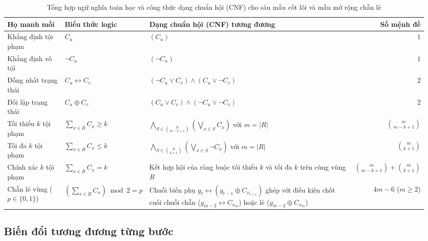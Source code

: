 \begin{table}[H]
\centering
\caption{%
    Tổng hợp ngữ nghĩa toán học và công thức dạng chuẩn hội (CNF) cho sáu mẫu cốt
    lõi và mẫu mở rộng chẵn lẻ}
\label{tab:cnf_catalog}
\footnotesize
\begin{tabularx}{\textwidth}{l l >{\raggedright\arraybackslash}X r}
\toprule
\textbf{Họ manh mối} & \textbf{Biểu thức logic} & \textbf{Dạng chuẩn hội (CNF)
tương đương} & \textbf{Số mệnh đề} \\
\midrule
Khẳng định tội phạm & $C_u$ & $(C_u)$ & $1$ \\
Khẳng định vô tội   & $\neg C_u$ & $(\neg C_u)$ & $1$ \\
\midrule
Đồng nhất trạng thái & $C_u \leftrightarrow C_v$ & $(\neg C_u \vee C_v) \wedge
(C_u \vee \neg C_v)$ & $2$ \\
Đối lập trạng thái & $C_u \oplus C_v$ & $(C_u \vee C_v) \wedge (\neg C_u \vee \neg
C_v)$ & $2$ \\
\midrule
Tối thiểu $k$ tội phạm & $\sum_{x \in R} C_x \ge k$ & $\bigwedge_{S \in
\binom{R}{m - k + 1}} \left(\bigvee_{x \in S} C_x\right)$ với $m = |R|$ &
$\binom{m}{m-k+1}$ \\
Tối đa $k$ tội phạm & $\sum_{x \in R} C_x \le k$ & $\bigwedge_{S \in \binom{R}{k +
1}} \left(\bigvee_{x \in S} \neg C_x\right)$ với $m = |R|$ & $\binom{m}{k+1}$ \\
Chính xác $k$ tội phạm & $\sum_{x \in R} C_x = k$ & Kết hợp hội của ràng buộc tối
thiểu $k$ và tối đa $k$ trên cùng vùng $R$ & $\binom{m}{m-k+1} + \binom{m}{k+1}$ \\
\midrule
Chẵn lẻ vùng ($p \in \{0, 1\}$) & $\left(\sum_{x \in R} C_x\right) \bmod 2 = p$ &
Chuỗi biến phụ $y_t \leftrightarrow (y_{t-1} \oplus C_{x_{t+1}})$ ghép với điều
kiện chốt cuối chuỗi chẵn ($y_{m-2} \leftrightarrow C_{x_m}$) hoặc lẻ
($y_{m-2} \oplus C_{x_m}$) & $4m - 6$ \newline \scriptsize ($m \ge 2$) \\
\bottomrule
\end{tabularx}
\end{table}

\subsection{Biến đổi tương đương từng bước}
\label{subsec:step_by_step_derivations}

